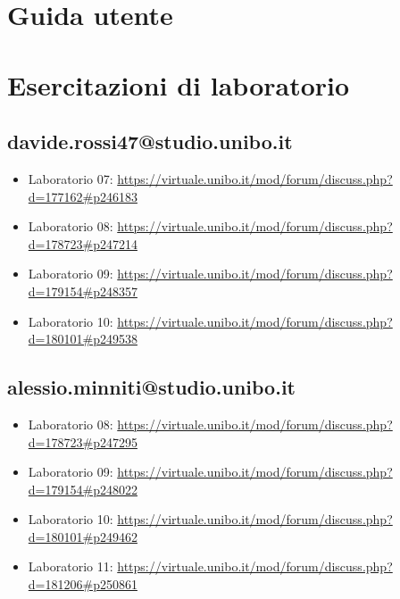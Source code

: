 \appendix
\chapter{Guida utente}

\chapter{Esercitazioni di laboratorio}
\section{davide.rossi47@studio.unibo.it}
\begin{itemize}
    \item Laboratorio 07: \url{https://virtuale.unibo.it/mod/forum/discuss.php?d=177162#p246183}
    \item Laboratorio 08: \url{https://virtuale.unibo.it/mod/forum/discuss.php?d=178723#p247214}
    \item Laboratorio 09: \url{https://virtuale.unibo.it/mod/forum/discuss.php?d=179154#p248357}
    \item Laboratorio 10: \url{https://virtuale.unibo.it/mod/forum/discuss.php?d=180101#p249538}
\end{itemize}
\section{alessio.minniti@studio.unibo.it}
\begin{itemize}
    \item Laboratorio 08: \url{https://virtuale.unibo.it/mod/forum/discuss.php?d=178723#p247295}
    \item Laboratorio 09: \url{https://virtuale.unibo.it/mod/forum/discuss.php?d=179154#p248022}
    \item Laboratorio 10: \url{https://virtuale.unibo.it/mod/forum/discuss.php?d=180101#p249462}
    \item Laboratorio 11: \url{https://virtuale.unibo.it/mod/forum/discuss.php?d=181206#p250861}
\end{itemize}